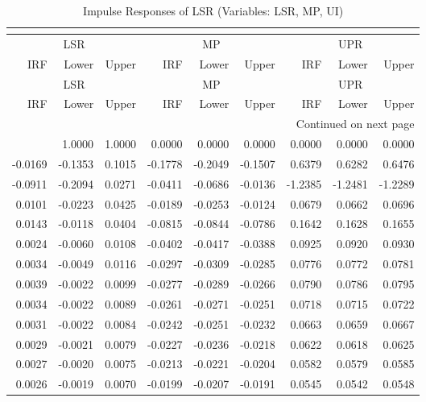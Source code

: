 \begin{longtable}{rrrrrrrrr}
\caption{Impulse Responses of LSR (Variables: LSR, MP, UI)}\\
\label{tab:lsr_irf_group1}\\
\toprule
\multicolumn{3}{c}{LSR} & \multicolumn{3}{c}{MP} & \multicolumn{3}{c}{UPR} \\
IRF & Lower & Upper & IRF & Lower & Upper & IRF & Lower & Upper \\
\midrule
\endfirsthead
\toprule
\multicolumn{3}{c}{LSR} & \multicolumn{3}{c}{MP} & \multicolumn{3}{c}{UPR} \\
IRF & Lower & Upper & IRF & Lower & Upper & IRF & Lower & Upper \\
\midrule
\endhead
\midrule
\multicolumn{9}{r}{Continued on next page} \\
\midrule
\endfoot
\bottomrule
\endlastfoot
1.0000 & 1.0000 & 1.0000 & 0.0000 & 0.0000 & 0.0000 & 0.0000 & 0.0000 & 0.0000 \\
-0.0169 & -0.1353 & 0.1015 & -0.1778 & -0.2049 & -0.1507 & 0.6379 & 0.6282 & 0.6476 \\
-0.0911 & -0.2094 & 0.0271 & -0.0411 & -0.0686 & -0.0136 & -1.2385 & -1.2481 & -1.2289 \\
0.0101 & -0.0223 & 0.0425 & -0.0189 & -0.0253 & -0.0124 & 0.0679 & 0.0662 & 0.0696 \\
0.0143 & -0.0118 & 0.0404 & -0.0815 & -0.0844 & -0.0786 & 0.1642 & 0.1628 & 0.1655 \\
0.0024 & -0.0060 & 0.0108 & -0.0402 & -0.0417 & -0.0388 & 0.0925 & 0.0920 & 0.0930 \\
0.0034 & -0.0049 & 0.0116 & -0.0297 & -0.0309 & -0.0285 & 0.0776 & 0.0772 & 0.0781 \\
0.0039 & -0.0022 & 0.0099 & -0.0277 & -0.0289 & -0.0266 & 0.0790 & 0.0786 & 0.0795 \\
0.0034 & -0.0022 & 0.0089 & -0.0261 & -0.0271 & -0.0251 & 0.0718 & 0.0715 & 0.0722 \\
0.0031 & -0.0022 & 0.0084 & -0.0242 & -0.0251 & -0.0232 & 0.0663 & 0.0659 & 0.0667 \\
0.0029 & -0.0021 & 0.0079 & -0.0227 & -0.0236 & -0.0218 & 0.0622 & 0.0618 & 0.0625 \\
0.0027 & -0.0020 & 0.0075 & -0.0213 & -0.0221 & -0.0204 & 0.0582 & 0.0579 & 0.0585 \\
0.0026 & -0.0019 & 0.0070 & -0.0199 & -0.0207 & -0.0191 & 0.0545 & 0.0542 & 0.0548 \\
\end{longtable}